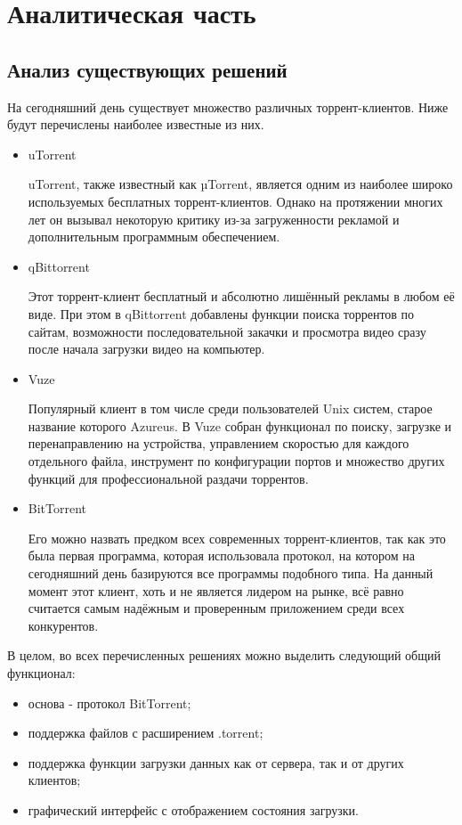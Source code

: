 \section{Аналитическая часть}

\subsection{Анализ существующих решений}

На сегодняшний день существует множество различных торрент-клиентов. Ниже будут перечислены наиболее известные из них.
\begin{itemize}
	\item uTorrent
	
	uTorrent, также известный как µTorrent, является одним из наиболее широко используемых бесплатных торрент-клиентов. Однако на протяжении многих лет он вызывал некоторую критику из-за загруженности рекламой и дополнительным программным обеспечением.
	
	\item qBittorrent
	
	Этот торрент-клиент бесплатный и абсолютно лишённый рекламы в любом её виде. При этом в qBittorrent добавлены функции поиска торрентов по сайтам, возможности последовательной закачки и просмотра видео сразу после начала загрузки видео на компьютер.
	
	\item Vuze
	
	Популярный клиент в том числе среди пользователей Unix систем, старое название которого Azureus. В Vuze собран функционал по поиску, загрузке и перенаправлению на устройства, управлением скоростью для каждого отдельного файла, инструмент по конфигурации портов и множество других функций для профессиональной раздачи торрентов.
	
	\item BitTorrent
	
	Его можно назвать предком всех современных торрент-клиентов, так как это была первая программа, которая использовала протокол, на котором на сегодняшний день базируются все программы подобного типа. На данный момент этот клиент, хоть и не является лидером на рынке, всё равно считается самым надёжным и проверенным приложением среди всех конкурентов.
\end{itemize}

В целом, во всех перечисленных решениях можно выделить следующий общий функционал:

\begin{itemize}
	\item основа - протокол BitTorrent;
	\item поддержка файлов с расширением .torrent;
	\item поддержка функции загрузки данных как от сервера, так и от других клиентов;
	\item графический интерфейс с отображением состояния загрузки.
\end{itemize}

